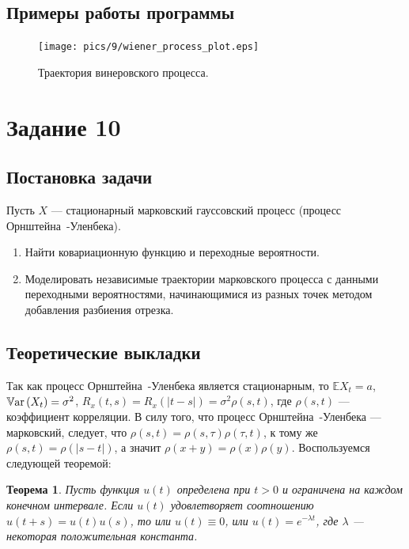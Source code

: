 \documentclass[11pt]{article}
\newtheorem{theorem}{Теорема}
\newcommand*{\hm}[1]{#1\nobreak\discretionary{}{\hbox{$\mathsurround=0pt #1$}}{}}
\newcommand\abs[1]{\left\lvert#1\right\rvert}
\newcommand{\Var}[1]{\mathbb{V}\mathrm{ar}\left( #1 \right)}
\begin{document}
\subsection{Примеры работы программы}
\begin{figure}[h!]
	\centering
	\texttt{[image: pics/9/wiener\_process\_plot.eps]}
	\caption{Траектория винеровского процесса.}
\end{figure}
\pagebreak
\section{Задание 10}
\subsection{Постановка задачи}
Пусть $X$ --- стационарный марковский гауссовский процесс (процесс Орнштейна~-Уленбека).
\begin{enumerate}
\item Найти ковариационную функцию и переходные вероятности.
\item Моделировать независимые траектории марковского процесса с данными переходными вероятностями, начинающимися из разных точек методом добавления разбиения отрезка.
\end{enumerate}
\subsection{Теоретические выкладки}
Так как процесс Орнштейна~-Уленбека является стационарным, то $\mathbb{E}X_t = a$, $\Var{X_t} \hm= \sigma^2$, $R_x(t, s) = R_x(\abs{t-s}) = \sigma^2 \rho(s, t)$, где $\rho(s, t)$ --- коэффициент корреляции. В силу того, что процесс Орнштейна~-Уленбека --- марковский, следует, что $\rho(s, t) = \rho(s, \tau)\rho(\tau, t)$, к тому же $\rho(s, t) = \rho(\abs{s - t})$, а значит $\rho(x + y) = \rho(x)\rho(y)$. Воспользуемся следующей теоремой:
\begin{theorem}
Пусть функция $u(t)$ определена при $t > 0$ и ограничена на каждом конечном интервале. Если $u(t)$ удовлетворяет соотношению $u(t + s) = u(t)u(s)$, то или $u(t) \equiv 0$, или $u(t) = e^{-\lambda t}$, где $\lambda$ --- некоторая положительная константа.
\end{theorem}
\end{document}
